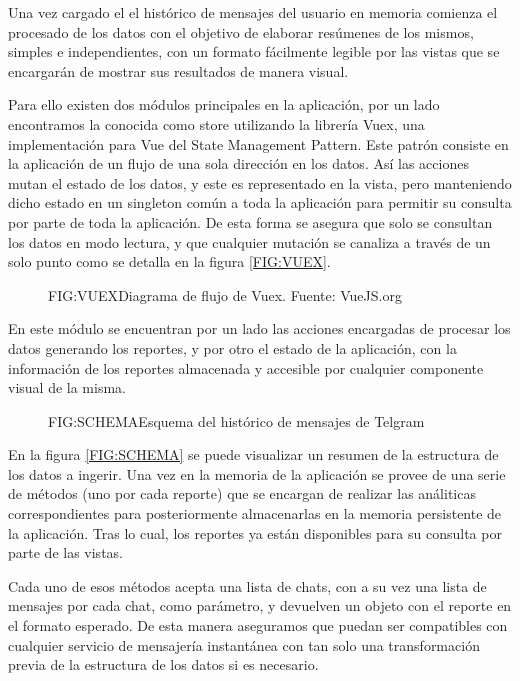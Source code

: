 
Una vez cargado el el histórico de mensajes del usuario en memoria comienza el procesado de los datos con el objetivo de elaborar resúmenes de los mismos, simples e independientes, con un formato fácilmente legible por las vistas que se encargarán de mostrar sus resultados de manera visual.

Para ello existen dos módulos principales en la aplicación, por un lado encontramos la conocida como store utilizando la librería Vuex, una implementación para Vue del State Management Pattern\cite{VueJS}. Este patrón consiste en la aplicación de un flujo de una sola dirección en los datos. Así las acciones mutan el estado de los datos, y este es representado en la vista, pero manteniendo dicho estado en un singleton común a toda la aplicación para permitir su consulta por parte de toda la aplicación. De esta forma se asegura que solo se consultan los datos en modo lectura, y que cualquier mutación se canaliza a través de un solo punto como se detalla en la figura \ref{FIG:VUEX}.

\begin{figure}[Diagrama de flujo de Vuex]{FIG:VUEX}{Diagrama de flujo de Vuex. Fuente: VueJS.org}
\end{figure}

En este módulo se encuentran por un lado las acciones encargadas de procesar los datos generando los reportes, y por otro el estado de la aplicación, con la información de los reportes almacenada y accesible por cualquier componente visual de la misma.

\begin{figure}[Esquema del histórico de mensajes de Telgram]{FIG:SCHEMA}{Esquema del histórico de mensajes de Telgram}
\end{figure}

En la figura \ref{FIG:SCHEMA} se puede visualizar un resumen de la estructura de los datos a ingerir. Una vez en la memoria de la aplicación se provee de una serie de métodos (uno por cada reporte) que se encargan de realizar las análiticas correspondientes para posteriormente almacenarlas en la memoria persistente de la aplicación. Tras lo cual, los reportes ya están disponibles para su consulta por parte de las vistas.

Cada uno de esos métodos acepta una lista de chats, con a su vez una lista de mensajes por cada chat, como parámetro, y devuelven un objeto con el reporte en el formato esperado. De esta manera aseguramos que puedan ser compatibles con cualquier servicio de mensajería instantánea con tan solo una transformación previa de la estructura de los datos si es necesario.

